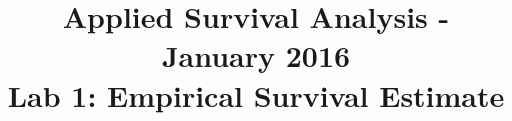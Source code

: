 \documentclass[11pt,a4paper]{article}
\begin{document}
\title{Applied Survival Analysis - January 2016\\Lab 1: Empirical Survival Estimate}
\date{\vspace{-10ex}}
\author{\vspace{-10ex}}
\maketitle

\end{document}

